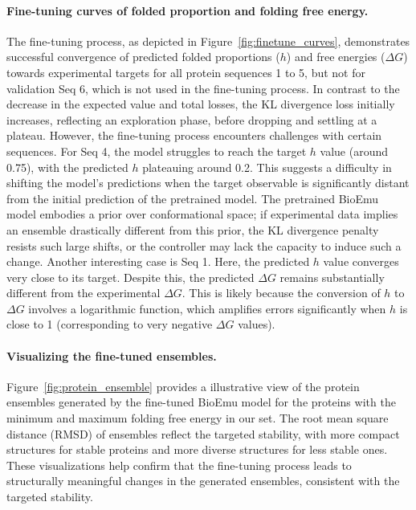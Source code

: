 \documentclass{article}
\theoremstyle{plain}
\theoremstyle{definition}
\theoremstyle{remark}
\begin{document}
\paragraph{Fine-tuning curves of folded proportion and folding free energy.}
The fine-tuning process, as depicted in Figure~\ref{fig:finetune_curves}, demonstrates successful convergence of predicted folded proportions ($h$) and free energies ($\Delta G$) towards experimental targets for all protein sequences 1 to 5, but not for validation Seq 6, which is not used in the fine-tuning process. In contrast to the decrease in the expected value and total losses, the KL divergence loss initially increases, reflecting an exploration phase, before dropping and settling at a plateau. However, the fine-tuning process encounters challenges with certain sequences. For Seq 4, the model struggles to reach the target $h$ value (around 0.75), with the predicted $h$ plateauing around 0.2. This suggests a difficulty in shifting the model's predictions when the target observable is significantly distant from the initial prediction of the pretrained model. The pretrained BioEmu model embodies a prior over conformational space; if experimental data implies an ensemble drastically different from this prior, the KL divergence penalty resists such large shifts, or the controller may lack the capacity to induce such a change.
Another interesting case is Seq 1. Here, the predicted $h$ value converges very close to its target. Despite this, the predicted $\Delta G$ remains substantially different from the experimental $\Delta G$. This is likely because the conversion of $h$ to $\Delta G$ involves a logarithmic function, which amplifies errors significantly when $h$ is close to 1 (corresponding to very negative $\Delta G$ values).

\paragraph{Visualizing the fine-tuned ensembles.}
Figure~\ref{fig:protein_ensemble} provides a illustrative view of the protein ensembles generated by the fine-tuned BioEmu model for the proteins with the minimum and maximum folding free energy in our set. The root mean square distance (RMSD) of ensembles reflect the targeted stability, with more compact structures for stable proteins and more diverse structures for less stable ones. These visualizations help confirm that the fine-tuning process leads to structurally meaningful changes in the generated ensembles, consistent with the targeted stability.
\end{document}
